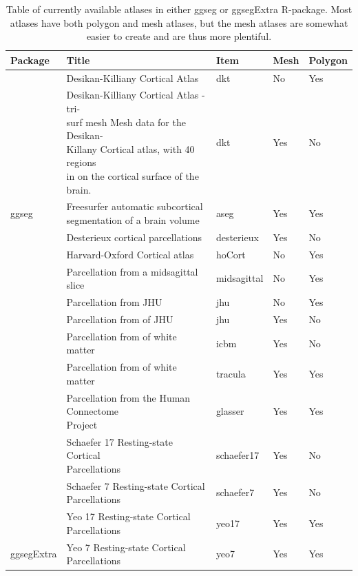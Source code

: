 \documentclass[fleqn,10pt]{wlpeerj} %
\begin{document}
\begin{table}[t]

\caption{\label{tab:atlasTab}Table of currently available atlases in either ggseg or ggsegExtra R-package. Most atlases have both polygon and mesh atlases, but the mesh atlases are somewhat easier to create and are thus more plentiful. }
\centering
\begin{tabular}{lllll}
\toprule
Package & Title & Item & Mesh & Polygon\\
\midrule
 & Desikan-Killiany Cortical Atlas & dkt & No & Yes\\
\cmidrule{2-5}
 & \makecell[l]{Desikan-Killiany Cortical Atlas - tri-\\surf mesh Mesh data for the Desikan-\\Killany Cortical atlas, with 40 regions\\in on the cortical surface of the brain.} & dkt & Yes & No\\
\cmidrule{2-5}
\multirow{-3}{*}{\raggedright\arraybackslash ggseg} & \makecell[l]{Freesurfer automatic subcortical\\segmentation of a brain volume} & aseg & Yes & Yes\\
\cmidrule{1-5}
 & Desterieux cortical parcellations & desterieux & Yes & No\\
\cmidrule{2-5}
 & Harvard-Oxford Cortical atlas & hoCort & No & Yes\\
\cmidrule{2-5}
 & Parcellation from a midsagittal slice & midsagittal & No & Yes\\
\cmidrule{2-5}
 & Parcellation from JHU & jhu & No & Yes\\
\cmidrule{2-5}
 & Parcellation from of JHU & jhu & Yes & No\\
\cmidrule{2-5}
 & Parcellation from of white matter & icbm & Yes & No\\
\cmidrule{2-5}
 & Parcellation from of white matter & tracula & Yes & Yes\\
\cmidrule{2-5}
 & \makecell[l]{Parcellation from the Human Connectome\\Project} & glasser & Yes & Yes\\
\cmidrule{2-5}
 & \makecell[l]{Schaefer 17 Resting-state Cortical\\Parcellations} & schaefer17 & Yes & No\\
\cmidrule{2-5}
 & \makecell[l]{Schaefer 7 Resting-state Cortical\\Parcellations} & schaefer7 & Yes & No\\
\cmidrule{2-5}
 & \makecell[l]{Yeo 17 Resting-state Cortical\\Parcellations} & yeo17 & Yes & Yes\\
\cmidrule{2-5}
\multirow{-12}{*}{\raggedright\arraybackslash ggsegExtra} & \makecell[l]{Yeo 7 Resting-state Cortical\\Parcellations} & yeo7 & Yes & Yes\\
\bottomrule
\end{tabular}
\end{table}
\end{document}
